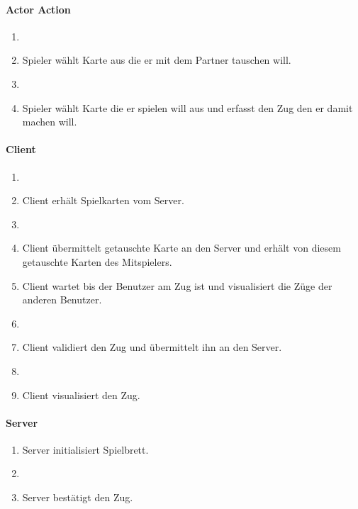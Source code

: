 \documentclass[12pt,halfparskip]{scrartcl}
\begin{document}
\begin{multicols}{3}
\raggedcolumns \centering
\paragraph{Actor Action}
\begin{enumerate}
	\item[] \vspace{3 \lineheight}
	\item[3] Spieler wählt Karte aus die er mit dem Partner tauschen will.
	\item[] \vspace{11 \lineheight}
	\item[6] Spieler wählt Karte die er spielen will aus und erfasst den Zug den er damit machen will.
\end{enumerate}
\columnbreak
\paragraph{Client}
\begin{enumerate}
	\item[] \vspace{1 \lineheight}
	\item[2] Client erhält Spielkarten vom Server.
	\item[] \vspace{2 \lineheight}
	\item[4] Client übermittelt getauschte Karte an den Server und erhält von diesem getauschte Karten des Mitspielers.
	\item[5] Client wartet bis der Benutzer am Zug ist und visualisiert die Züge der anderen Benutzer.
	\item[] \vspace{3 \lineheight}
	\item[7] Client validiert den Zug und übermittelt ihn an den Server.
	\item[] \vspace{1 \lineheight}
	\item[9] Client visualisiert den Zug.
\end{enumerate}
\columnbreak
\paragraph{Server}
\begin{enumerate}
	\item[1] Server initialisiert Spielbrett.
	\item[] \vspace{24 \lineheight}
	\item[8] Server bestätigt den Zug.
\end{enumerate}
\end{multicols}
\end{document}
